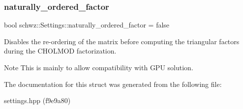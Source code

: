 \subsubsection{\texorpdfstring{naturally\+\_\+ordered\+\_\+factor}{naturally\_ordered\_factor}}
{\footnotesize\ttfamily bool schwz\+::\+Settings\+::naturally\+\_\+ordered\+\_\+factor = false}



Disables the re-\/ordering of the matrix before computing the triangular factors during the C\+H\+O\+L\+M\+OD factorization. 

\begin{DoxyNote}{Note}
This is mainly to allow compatibility with G\+PU solution. 
\end{DoxyNote}


The documentation for this struct was generated from the following file\+:\begin{DoxyCompactItemize}
\item 
settings.\+hpp (f9e9a80)\end{DoxyCompactItemize}
